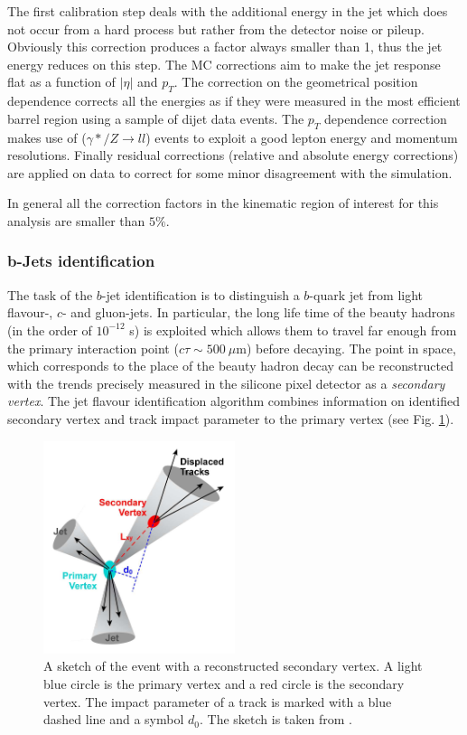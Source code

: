 The first calibration step deals with the additional energy in the jet which does not occur from a hard process but rather from the detector noise or pileup. 
Obviously this correction produces a factor always smaller than 1, thus the jet energy reduces on this step. The MC corrections aim to make the jet response
flat as a function of $|\eta|$ and $p_{T}$. The correction on the geometrical position dependence corrects all the energies as if they were measured 
in the most efficient barrel region using a sample of dijet data events. The $p_{T}$ dependence correction makes use of ($\gamma */Z \rightarrow ll$) events to exploit a good
lepton energy and momentum resolutions. Finally residual corrections (relative and absolute energy corrections) are applied on data to correct for 
some minor disagreement with the simulation.

In general all the correction factors in the kinematic region of interest for this analysis are smaller than $5\%$.

\subsubsection{b-Jets identification}\label{ssec:bTag}

The task of the $b$-jet identification is to distinguish a $b$-quark jet from light flavour-, $c$- and gluon-jets. In particular,
the long life time of the beauty hadrons (in the order of $10^{-12}$ s) is exploited which allows them to travel far enough from the primary interaction point 
($c\tau \sim 500\:\mu$m) before decaying. The point in space, which corresponds to the place of the beauty hadron decay can be reconstructed with the trends
precisely measured in the silicone pixel detector as a \textit{secondary vertex}. The jet flavour identification algorithm combines information on identified 
secondary vertex and track impact parameter to the primary vertex (see Fig. \ref{fig:SV}).

\begin{figure}[t]
  \centering
  \includegraphics[width=0.5\textwidth]{04_event_reconstruction/plots/btagging_cartoon.png}
  \caption{A sketch of the event with a reconstructed secondary vertex. A light blue circle is the primary vertex and a red circle is the secondary vertex. The impact 
  parameter of a track is marked with a blue dashed line and a symbol $d_{0}$. The sketch is taken from \cite{Galtieri:2011yd}.}
  \label{fig:SV}
\end{figure}

